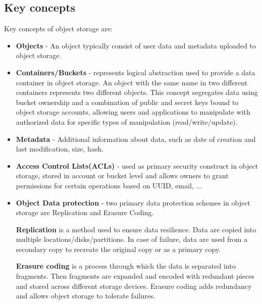     \subsection*{Key concepts}
    Key concepts of object storage are\cite{ibmObjectStorage}:
    \begin{itemize}
        \item \textbf{Objects} - An object typically consist of user data and metadata uploaded to object storage.
        \item \textbf{Containers/Buckets} - represents logical abstraction used to provide a data container in object storage. An object with the same name in two different containers represents two different objects. This concept segregates data using bucket ownership and a combination of public and secret keys bound to object storage accounts, allowing users and applications to manipulate with authorized data for specific types of manipulation (read/write/update).
        \item \textbf{Metadata} - Additional information about data, such as date of creation and last modification, size, hash.
        \item \textbf{Access Control Lists(ACLs)} - used as primary security construct in object storage, stored in account or bucket level and allows owners to grant permissions for certain operations based on UUID, email, ...
        \item \textbf{Object Data protection} - two primary data protection schemes in object storage are Replication and Erasure Coding.

        \textbf{Replication} is a method used to ensure data resilience. Data are copied into multiple locations/disks/partitions. In case of failure, data are used from a secondary copy to recreate the original copy or as a primary copy.

        \textbf{Erasure coding} is a process through which the data is separated into fragments. Then fragments are expanded and encoded with redundant pieces and stored across different storage devices. Erasure coding adds redundancy and allows object storage to tolerate failures.
    \end{itemize}


